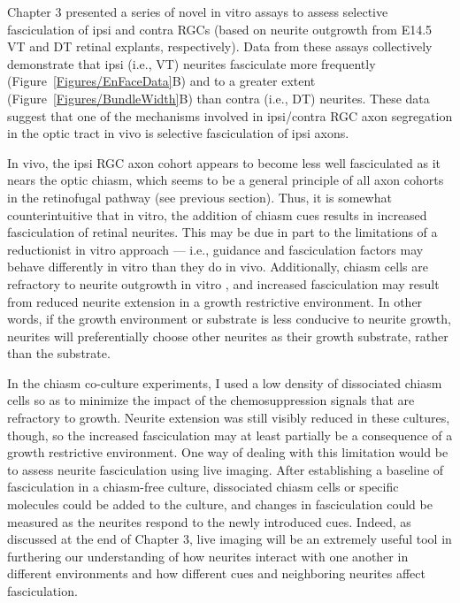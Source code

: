 Chapter 3 presented a series of novel in vitro assays to assess selective fasciculation of ipsi and contra RGCs (based on neurite outgrowth from E14.5 VT and DT retinal explants, respectively).
Data from these assays collectively demonstrate that ipsi (i.e., VT) neurites fasciculate more frequently (Figure~\ref{Figures/EnFaceData}B) and to a greater extent (Figure~\ref{Figures/BundleWidth}B) than contra (i.e., DT) neurites.
These data suggest that one of the mechanisms involved in ipsi/contra RGC axon segregation in the optic tract in vivo is selective fasciculation of ipsi axons.

In vivo, the ipsi RGC axon cohort appears to become less well fasciculated as it nears the optic chiasm, which seems to be a general principle of all axon cohorts in the retinofugal pathway (see previous section).
Thus, it is somewhat counterintuitive that in vitro, the addition of chiasm cues results in increased fasciculation of retinal neurites.
This may be due in part to the limitations of a reductionist in vitro approach --- i.e., guidance and fasciculation factors may behave differently in vitro than they do in vivo.
Additionally, chiasm cells are refractory to neurite outgrowth in vitro \cite{wang1995crossed,wang1996chemosuppression}, and increased fasciculation may result from reduced neurite extension in a growth restrictive environment.
In other words, if the growth environment or substrate is less conducive to neurite growth, neurites will preferentially choose other neurites as their growth substrate, rather than the substrate.

In the chiasm co-culture experiments, I used a low density of dissociated chiasm cells so as to minimize the impact of the chemosuppression signals that are refractory to growth.
Neurite extension was still visibly reduced in these cultures, though, so the increased fasciculation may at least partially be a consequence of a growth restrictive environment.
One way of dealing with this limitation would be to assess neurite fasciculation using live imaging.
After establishing a baseline of fasciculation in a chiasm-free culture, dissociated chiasm cells or specific molecules could be added to the culture, and changes in fasciculation could be measured as the neurites respond to the newly introduced cues.
Indeed, as discussed at the end of Chapter 3, live imaging will be an extremely useful tool in furthering our understanding of how neurites interact with one another in different environments and how different cues and neighboring neurites affect fasciculation.

